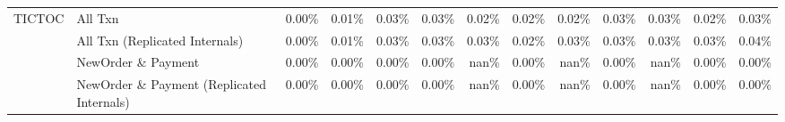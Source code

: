 \begin{tabular}{llrrrrrrrrrrr}
TICTOC & All Txn & 0.00\% & 0.01\% & 0.03\% & 0.03\% & 0.02\% & 0.02\% & 0.02\% & 0.03\% & 0.03\% & 0.02\% & 0.03\% \\
       & All Txn (Replicated Internals) & 0.00\% & 0.01\% & 0.03\% & 0.03\% & 0.03\% & 0.02\% & 0.03\% & 0.03\% & 0.03\% & 0.03\% & 0.04\% \\
       & NewOrder \& Payment & 0.00\% & 0.00\% & 0.00\% & 0.00\% &  nan\% & 0.00\% &  nan\% & 0.00\% &  nan\% & 0.00\% & 0.00\% \\
       & NewOrder \& Payment (Replicated Internals) & 0.00\% & 0.00\% & 0.00\% & 0.00\% &  nan\% & 0.00\% &  nan\% & 0.00\% &  nan\% & 0.00\% & 0.00\% \\
\bottomrule
\end{tabular}
